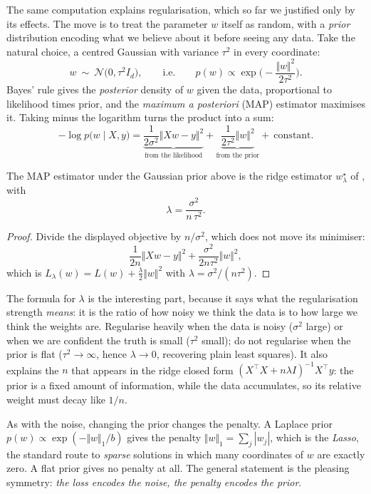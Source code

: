 The same computation explains regularisation, which so far we justified only by its
effects. The move is to treat the parameter $w$ itself as random, with a
\emph{prior} distribution encoding what we believe about it before seeing any data. Take
the natural choice, a centred Gaussian with variance $\tau^2$ in every coordinate:
\[
w \ \sim \ \mathcal{N}\big( 0, \tau^2 I_d \big) ,
\qquad\text{i.e.}\qquad
p(w) \propto \exp\Big( - \frac{\Vert w \Vert^2}{2\tau^2} \Big) .
\]
Bayes' rule gives the \emph{posterior} density of $w$ given the data, proportional to
likelihood times prior, and the \emph{maximum a posteriori} (MAP) estimator maximises
it. Taking minus the logarithm turns the product into a sum:
\[
- \log p\big( w \mid X, y \big)
= \underbrace{\frac{1}{2\sigma^2} \big\Vert X w - y \big\Vert^2}_{\text{from the likelihood}}
+ \underbrace{\frac{1}{2\tau^2} \big\Vert w \big\Vert^2}_{\text{from the prior}}
+ \ \text{constant} .
\]

\begin{prop}
\label{prop:map-ridge}
The MAP estimator under the Gaussian prior above is the ridge estimator
$w^\star_\lambda$ of , with
\[
\lambda = \frac{\sigma^2}{n\, \tau^2} .
\]
\end{prop}

\begin{proof}
Divide the displayed objective by $n/\sigma^2$, which does not move its minimiser:
\[
\frac{1}{2n} \big\Vert Xw - y \big\Vert^2 + \frac{\sigma^2}{2 n \tau^2} \Vert w \Vert^2 ,
\]
which is $L_\lambda(w) = L(w) + \tfrac{\lambda}{2}\Vert w\Vert^2$ with $\lambda =
\sigma^2 / (n\tau^2)$.
\end{proof}

The formula for $\lambda$ is the interesting part, because it says what the
regularisation strength \emph{means}: it is the ratio of how noisy we think the data is
to how large we think the weights are. Regularise heavily when the data is noisy
($\sigma^2$ large) or when we are confident the truth is small ($\tau^2$ small); do not
regularise when the prior is flat ($\tau^2 \to \infty$, hence $\lambda \to 0$, recovering
plain least squares). It also explains the $n$ that appears in the ridge closed form
$(X^\top X + n\lambda I)^{-1}X^\top y$: the prior is a fixed amount of information,
while the data accumulates, so its relative weight must decay like $1/n$.

\begin{remark}
As with the noise, changing the prior changes the penalty. A Laplace prior $p(w)
\propto \exp(-\Vert w\Vert_1 / b)$ gives the penalty $\Vert w \Vert_1 = \sum_j |w_j|$,
which is the \emph{Lasso}, the standard route to \emph{sparse} solutions in which many
coordinates of $w$ are exactly zero. A flat prior gives no penalty at all. The general
statement is the pleasing symmetry: \emph{the loss encodes the noise, the penalty
encodes the prior}.
\end{remark}

